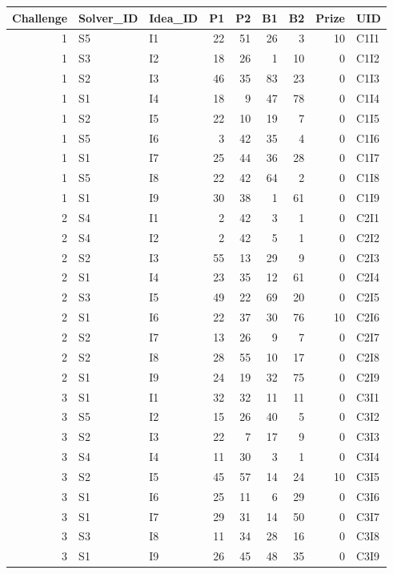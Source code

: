 \documentclass[]{elsarticle} %
\begin{document}
\begin{tabular}{r|l|l|r|r|r|r|r|l}
\hline
Challenge & Solver\_ID & Idea\_ID & P1 & P2 & B1 & B2 & Prize & UID\\
\hline
1 & S5 & I1 & 22 & 51 & 26 & 3 & 10 & C1I1\\
\hline
1 & S3 & I2 & 18 & 26 & 1 & 10 & 0 & C1I2\\
\hline
1 & S2 & I3 & 46 & 35 & 83 & 23 & 0 & C1I3\\
\hline
1 & S1 & I4 & 18 & 9 & 47 & 78 & 0 & C1I4\\
\hline
1 & S2 & I5 & 22 & 10 & 19 & 7 & 0 & C1I5\\
\hline
1 & S5 & I6 & 3 & 42 & 35 & 4 & 0 & C1I6\\
\hline
1 & S1 & I7 & 25 & 44 & 36 & 28 & 0 & C1I7\\
\hline
1 & S5 & I8 & 22 & 42 & 64 & 2 & 0 & C1I8\\
\hline
1 & S1 & I9 & 30 & 38 & 1 & 61 & 0 & C1I9\\
\hline
2 & S4 & I1 & 2 & 42 & 3 & 1 & 0 & C2I1\\
\hline
2 & S4 & I2 & 2 & 42 & 5 & 1 & 0 & C2I2\\
\hline
2 & S2 & I3 & 55 & 13 & 29 & 9 & 0 & C2I3\\
\hline
2 & S1 & I4 & 23 & 35 & 12 & 61 & 0 & C2I4\\
\hline
2 & S3 & I5 & 49 & 22 & 69 & 20 & 0 & C2I5\\
\hline
2 & S1 & I6 & 22 & 37 & 30 & 76 & 10 & C2I6\\
\hline
2 & S2 & I7 & 13 & 26 & 9 & 7 & 0 & C2I7\\
\hline
2 & S2 & I8 & 28 & 55 & 10 & 17 & 0 & C2I8\\
\hline
2 & S1 & I9 & 24 & 19 & 32 & 75 & 0 & C2I9\\
\hline
3 & S1 & I1 & 32 & 32 & 11 & 11 & 0 & C3I1\\
\hline
3 & S5 & I2 & 15 & 26 & 40 & 5 & 0 & C3I2\\
\hline
3 & S2 & I3 & 22 & 7 & 17 & 9 & 0 & C3I3\\
\hline
3 & S4 & I4 & 11 & 30 & 3 & 1 & 0 & C3I4\\
\hline
3 & S2 & I5 & 45 & 57 & 14 & 24 & 10 & C3I5\\
\hline
3 & S1 & I6 & 25 & 11 & 6 & 29 & 0 & C3I6\\
\hline
3 & S1 & I7 & 29 & 31 & 14 & 50 & 0 & C3I7\\
\hline
3 & S3 & I8 & 11 & 34 & 28 & 16 & 0 & C3I8\\
\hline
3 & S1 & I9 & 26 & 45 & 48 & 35 & 0 & C3I9\\
\hline
\end{tabular}
\end{document}

